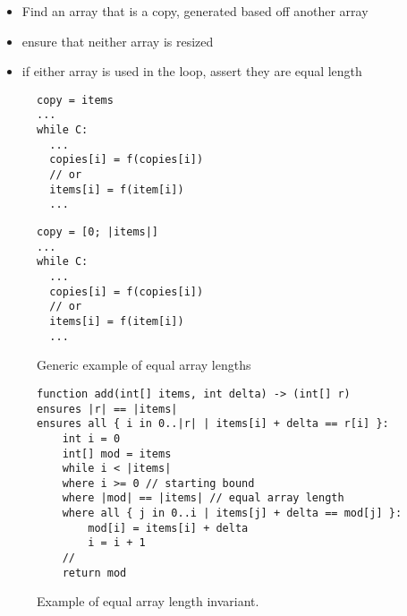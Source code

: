 

\begin{itemize}
	\item Find an array that is a copy, generated based off another array
	\item ensure that neither array is resized
	\item if either array is used in the loop, assert they are equal length
\end{itemize}

\begin{figure}[ht]
\noindent
\begin{minipage}{.45\textwidth}
\begin{lstlisting}
copy = items
...
while C:
  ...
  copies[i] = f(copies[i])
  // or
  items[i] = f(item[i])
  ...
\end{lstlisting}
\end{minipage}\hfill
\begin{minipage}{.45\textwidth}
\begin{lstlisting}
copy = [0; |items|]
...
while C:
  ...
  copies[i] = f(copies[i])
  // or
  items[i] = f(item[i])
  ...
\end{lstlisting}
\end{minipage}

\caption{Generic example of equal array lengths}
\label{lst:generic-array-length}
\end{figure}

\begin{figure}[ht]
\begin{lstlisting}
function add(int[] items, int delta) -> (int[] r)
ensures |r| == |items|
ensures all { i in 0..|r| | items[i] + delta == r[i] }:
    int i = 0
    int[] mod = items
    while i < |items|
    where i >= 0 // starting bound
    where |mod| == |items| // equal array length
    where all { j in 0..i | items[j] + delta == mod[j] }:
        mod[i] = items[i] + delta
        i = i + 1
    //
    return mod
\end{lstlisting}
\caption{Example of equal array length invariant.}
\label{lst:array-length-eq}
\end{figure}

